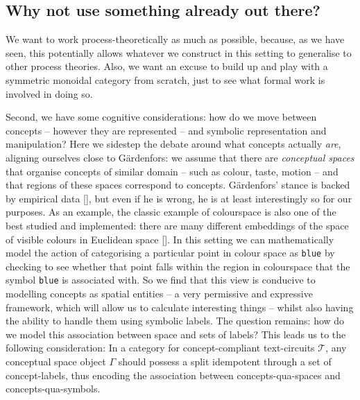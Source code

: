 \subsection{Why not use something already out there?}

 We want to work process-theoretically as much as possible, because, as we have seen, this potentially allows whatever we construct in this setting to generalise to other process theories. Also, we want an excuse to build up and play with a symmetric monoidal category from scratch, just to see what formal work is involved in doing so.

\label{just:rel} Second, we have some cognitive considerations: how do we move between concepts -- however they are represented -- and symbolic representation and manipulation? Here we sidestep the debate around what concepts actually \emph{are}, aligning ourselves close to G\"{a}rdenfors: we assume that there are \emph{conceptual spaces} that organise concepts of similar domain -- such as colour, taste, motion -- and that regions of these spaces correspond to concepts. G\"{a}rdenfors' stance is backed by empirical data [], but even if he is wrong, he is at least interestingly so for our purposes. As an example, the classic example of colourspace is also one of the best studied and implemented: there are many different embeddings of the space of visible colours in Euclidean space []. In this setting we can mathematically model the action of categorising a particular point in colour space as \texttt{blue} by checking to see whether that point falls within the region in colourspace that the symbol \texttt{blue} is associated with. So we find that this view is conducive to modelling concepts as spatial entities -- a very permissive and expressive framework, which will allow us to calculate interesting things -- whilst also having the ability to handle them using symbolic labels. The question remains: how do we model this association between space and sets of labels? This leads us to the following consideration: In a category for concept-compliant text-circuits $\mathcal{T}$, any conceptual space object $\Gamma$ should possess a split idempotent through a set of concept-labels, thus encoding the association between concepts-qua-spaces and concepts-qua-symbols.\\

